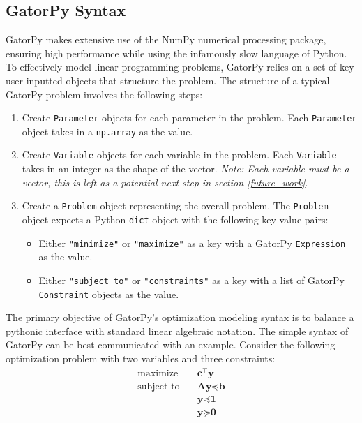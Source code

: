 \documentclass[conference]{IEEEtran}
\begin{document}
\subsection{GatorPy Syntax}
\label{Syntax}
GatorPy makes extensive use of the NumPy numerical processing package, ensuring high performance while using the infamously slow language of Python. 
To effectively model linear programming problems, GatorPy relies on a set of key user-inputted objects that structure the problem.
The structure of a typical GatorPy problem involves the following steps:

\begin{enumerate}
    \item Create \texttt{Parameter} objects for each parameter in the problem.
    Each \texttt{Parameter} object takes in a \texttt{np.array} as the value.
    \item Create \texttt{Variable} objects for each variable in the problem.
    Each \texttt{Variable} takes in an integer as the shape of the vector.
    \textit{Note: Each variable must be a vector, this is left as a potential next step in section \ref{future_work}}.
    \item Create a \texttt{Problem} object representing the overall problem.
    The \texttt{Problem} object expects a Python \texttt{dict} object with the following key-value pairs:
    \begin{itemize}
        \item Either \texttt{"minimize"} or \texttt{"maximize"} as a key with a GatorPy \texttt{Expression} as the value.
        \item Either \texttt{"subject to"} or \texttt{"constraints"} as a key with a list of GatorPy \texttt{Constraint} objects as the value.
    \end{itemize}
\end{enumerate}
The primary objective of GatorPy's optimization modeling syntax is to balance a pythonic interface with standard linear algebraic notation.
The simple syntax of GatorPy can be best communicated with an example.
Consider the following optimization problem with two variables and three constraints:
\begin{align*}
  \text{maximize} & \quad \textbf{c}^\top \textbf{y} \\
  \text{subject to} & \quad \textbf{A} \textbf{y} \preceq \textbf{b} \\
  & \quad \textbf{y} \preceq \textbf{1} \\
  & \quad \textbf{y} \succeq \textbf{0}
\end{align*}
\end{document}
